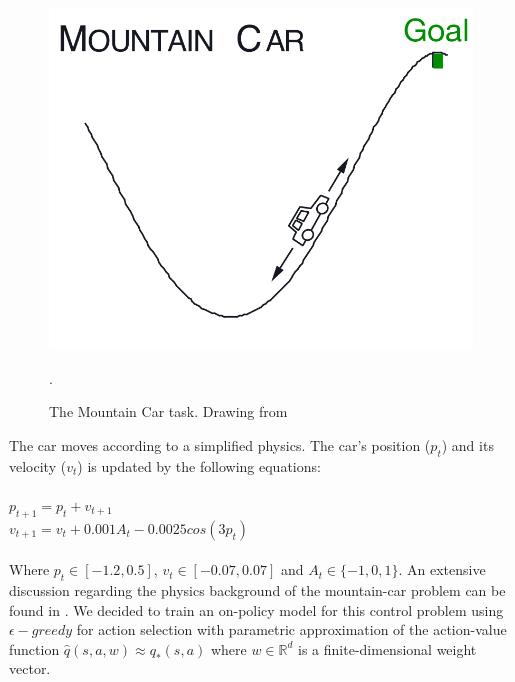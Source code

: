 \documentclass[10pt,twocolumn]{article}
\begin{document}
\begin{figure}
  \begin{center}
      \includegraphics[scale=0.2]{mountain-car.png}
  \end{center}
  \caption{The Mountain Car task. Drawing from \cite{Sutton1998}}.
  \label{mountain_car}
\end{figure}

The car moves according to a simplified physics. The car's position ($p_{t}$) and its velocity ($v_{t}$) is updated by the following equations:
\\ \\
$p_{t+1} = p_{t} + v_{t+1}$
\\
$v_{t+1} = v_{t} + 0.001A_{t} - 0.0025cos(3p_{t})$
\\ \\
Where $p_{t}\in[-1.2,0.5]$, $v_{t}\in[-0.07,0.07]$ and $A_{t}\in\{-1, 0, 1\}$. An extensive discussion regarding the physics background of the mountain-car problem can be found in \cite{Mountain}. We decided to train an on-policy model for this control problem
using $\epsilon-greedy$ for action selection with parametric approximation of the action-value function $\hat{q}(s, a, w) \approx q_*(s,a)$ where $w\in\mathbb{R}^d$ is a finite-dimensional weight vector.
\end{document}
